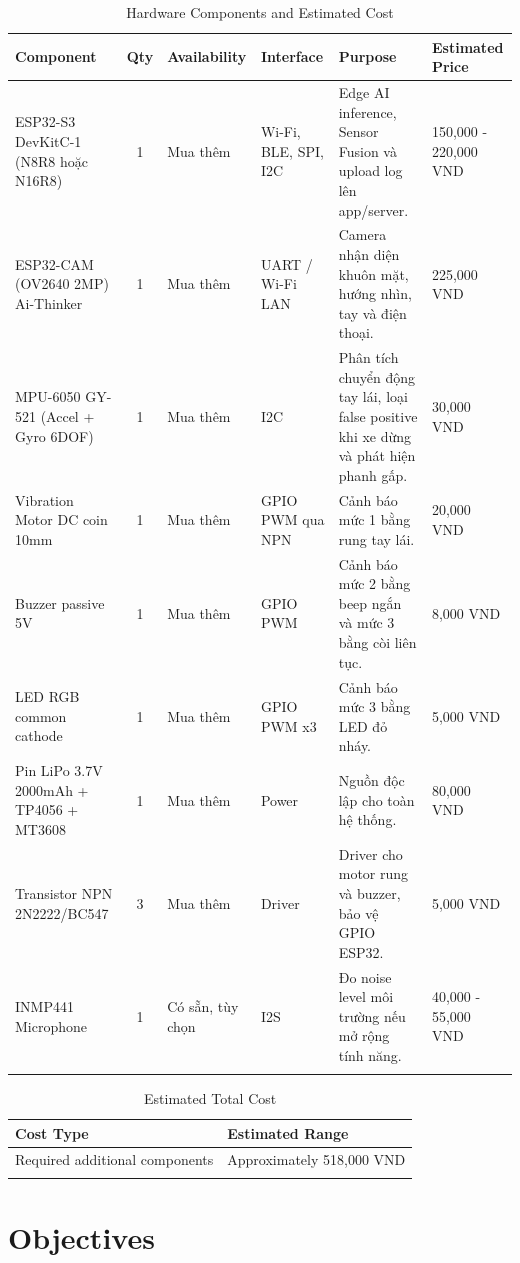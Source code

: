 \documentclass[12pt,a4paper]{article}
\begin{document}
\begin{longtable}{|P{3cm}|c|P{2.2cm}|P{2cm}|P{4.2cm}|P{2.3cm}|}
\hline
\textbf{Component} & \textbf{Qty} & \textbf{Availability} & \textbf{Interface} & \textbf{Purpose} & \textbf{Estimated Price} \\
\hline
ESP32-S3 DevKitC-1 (N8R8 hoặc N16R8) & 1 & Mua thêm & Wi-Fi, BLE, SPI, I2C & Edge AI inference, Sensor Fusion và upload log lên app/server. & 150,000 - 220,000 VND \\
\hline
ESP32-CAM (OV2640 2MP) Ai-Thinker & 1 & Mua thêm & UART / Wi-Fi LAN & Camera nhận diện khuôn mặt, hướng nhìn, tay và điện thoại. & 225,000 VND \\
\hline
MPU-6050 GY-521 (Accel + Gyro 6DOF) & 1 & Mua thêm & I2C & Phân tích chuyển động tay lái, loại false positive khi xe dừng và phát hiện phanh gấp. & 30,000 VND \\
\hline
Vibration Motor DC coin 10mm & 1 & Mua thêm & GPIO PWM qua NPN & Cảnh báo mức 1 bằng rung tay lái. & 20,000 VND \\
\hline
Buzzer passive 5V & 1 & Mua thêm & GPIO PWM & Cảnh báo mức 2 bằng beep ngắn và mức 3 bằng còi liên tục. & 8,000 VND \\
\hline
LED RGB common cathode & 1 & Mua thêm & GPIO PWM x3 & Cảnh báo mức 3 bằng LED đỏ nháy. & 5,000 VND \\
\hline
Pin LiPo 3.7V 2000mAh + TP4056 + MT3608 & 1 & Mua thêm & Power & Nguồn độc lập cho toàn hệ thống. & 80,000 VND \\
\hline
Transistor NPN 2N2222/BC547 & 3 & Mua thêm & Driver & Driver cho motor rung và buzzer, bảo vệ GPIO ESP32. & 5,000 VND \\
\hline
INMP441 Microphone & 1 & Có sẵn, tùy chọn & I2S & Đo noise level môi trường nếu mở rộng tính năng. & 40,000 - 55,000 VND \\
\hline
\caption{Hardware Components and Estimated Cost}
\end{longtable}

\begin{longtable}{|P{5cm}|P{7cm}|}
\hline
\textbf{Cost Type} & \textbf{Estimated Range} \\
\hline
Required additional components & Approximately 518,000 VND \\
\hline
\caption{Estimated Total Cost}
\end{longtable}

\newpage
\section{Objectives}
\end{document}
